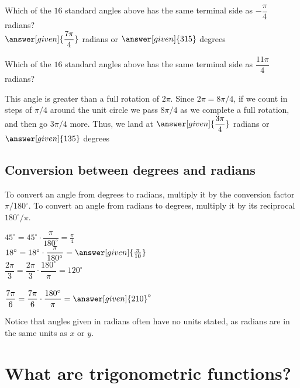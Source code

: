 \documentclass{ximera}
\begin{document}
\begin{example}
Which of the $16$ standard angles above has the same terminal side as $-\dfrac{\pi}{4}$ radians? 
\\$\answer[given]{\dfrac{7\pi}{4}}$ radians or $\answer[given]{315}$ degrees
\end{example}

\begin{example}
Which of the $16$ standard angles above has the same terminal side as $\dfrac{11\pi}{4}$ radians? 
\begin{explanation}
This angle is greater than a full rotation of $2\pi$. Since $2\pi=8\pi/4$, if we count in steps of $\pi/4$ around the unit circle we pass $8\pi/4$ as we complete a full rotation, and then go $3\pi/4$ more. Thus, we land at
$\answer[given]{\dfrac{3\pi}{4}}$ radians or $\answer[given]{135}$ degrees

\end{explanation}
\end{example}


\subsection{Conversion between degrees and radians}
To convert an angle from degrees to radians, multiply it by the conversion factor $\pi/180^{\circ}$. To convert an angle from radians to degrees, multiply it by its reciprocal $180^{\circ}/\pi$.

\begin{example}

$45^{\circ}=45^{\circ}\cdot\dfrac{\pi}{180^{\circ}}=\frac{\pi}{4}$
\\$18^{\circ}=18^{\circ}\cdot\dfrac{\pi}{180^{\circ}}=\answer[given]{\frac{\pi}{10}}$
\\$\dfrac{2\pi}{3}= \dfrac{2\pi}{3}\cdot\dfrac{180^{\circ}}{\pi}=120^{\circ}$\\
\\$\dfrac{7\pi}{6}= \dfrac{7\pi}{6}\cdot\dfrac{180^{\circ}}{\pi}=\answer[given]{210}^{\circ}$

Notice that angles given in radians often have no units stated, as radians are in the same units as $x$ or $y$.

\end{example}
\section{What are trigonometric functions?}
%
\end{document}
